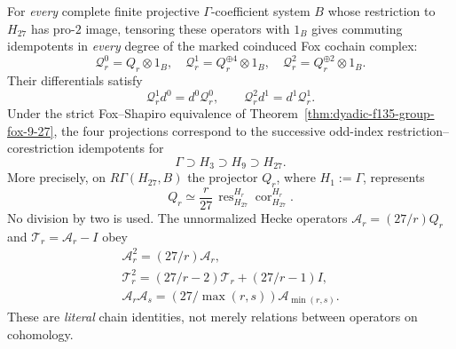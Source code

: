 \begin{theorem}
For \emph{every}
complete finite
projective
$\Gamma$-coefficient
system $B$
whose restriction
to $H_{27}$
has pro-$2$
image, tensoring
these operators
with $1_B$
gives commuting
idempotents in
\emph{every}
degree of the
marked coinduced
Fox cochain
complex:
\begin{equation}\label{eq:dyadic-f135-four-heeke-cochain-projectors}
\boxed{
\mathcal Q_r^0=Q_r\otimes1_B,\quad
\mathcal Q_r^1=Q_r^{\oplus4}\otimes1_B,\quad
\mathcal Q_r^2=Q_r^{\oplus2}\otimes1_B.
}
\end{equation}
Their differentials
satisfy
\[
\mathcal Q_r^1d^0
=d^0\mathcal Q_r^0,
\qquad
\mathcal Q_r^2d^1
=d^1\mathcal Q_r^1.
\]
Under the strict
Fox--Shapiro
equivalence of
Theorem~\ref{thm:dyadic-f135-group-fox-9-27},
the four projections
correspond to
the successive
odd-index
restriction--corestriction
idempotents for
\[
\Gamma\supset H_3
\supset H_9
\supset H_{27}.
\]
More precisely, on
$R\Gamma(H_{27},B)$
the projector $Q_r$,
where
$H_1:=\Gamma$,
represents
\begin{equation}\label{eq:dyadic-f135-derived-transfer-correspondence}
\boxed{
Q_r\simeq
\frac{r}{27}\,
\operatorname{res}_{H_{27}}^{H_r}
\operatorname{cor}_{H_{27}}^{H_r}.
}
\end{equation}
No division by
two is used.
The unnormalized
Hecke operators
$\mathcal A_r=(27/r)Q_r$
and
$\mathcal T_r=\mathcal A_r-I$
obey
\begin{equation}\label{eq:dyadic-f135-coherent-Hecke-polynomial}
\boxed{
\begin{gathered}
\mathcal A_r^2=(27/r)\mathcal A_r,\\
\mathcal T_r^2=
(27/r-2)\mathcal T_r+
(27/r-1)I,\\
\mathcal A_r\mathcal A_s
=(27/\max(r,s))\mathcal A_{\min(r,s)}.
\end{gathered}}
\end{equation}
These are
\emph{literal}
chain identities,
not merely
relations between
operators on
cohomology.
\end{theorem}

